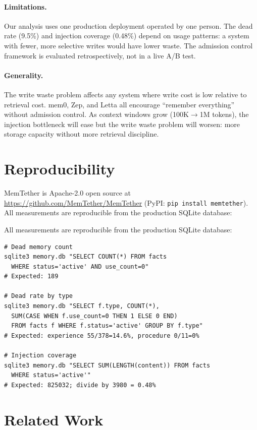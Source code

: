 \documentclass[11pt]{article}
\begin{document}
\paragraph{Limitations.} Our analysis uses one production deployment operated by one person. The dead rate (9.5\%) and injection coverage (0.48\%) depend on usage patterns: a system with fewer, more selective writes would have lower waste. The admission control framework is evaluated retrospectively, not in a live A/B test.

\paragraph{Generality.} The write waste problem affects any system where write cost is low relative to retrieval cost. mem0, Zep, and Letta all encourage ``remember everything'' without admission control. As context windows grow (100K$\to$1M tokens), the injection bottleneck will ease but the write waste problem will worsen: more storage capacity without more retrieval discipline.

\section{Reproducibility}

MemTether is Apache-2.0 open source at \url{https://github.com/MemTether/MemTether} (PyPI: \texttt{pip install memtether}). All measurements are reproducible from the production SQLite database:

All measurements are reproducible from the production SQLite database:

\begin{verbatim}
# Dead memory count
sqlite3 memory.db "SELECT COUNT(*) FROM facts 
  WHERE status='active' AND use_count=0"
# Expected: 189

# Dead rate by type
sqlite3 memory.db "SELECT f.type, COUNT(*), 
  SUM(CASE WHEN f.use_count=0 THEN 1 ELSE 0 END) 
  FROM facts f WHERE f.status='active' GROUP BY f.type"
# Expected: experience 55/378=14.6%, procedure 0/11=0%

# Injection coverage
sqlite3 memory.db "SELECT SUM(LENGTH(content)) FROM facts 
  WHERE status='active'"
# Expected: 825032; divide by 3980 = 0.48%
\end{verbatim}

\section{Related Work}
\end{document}
